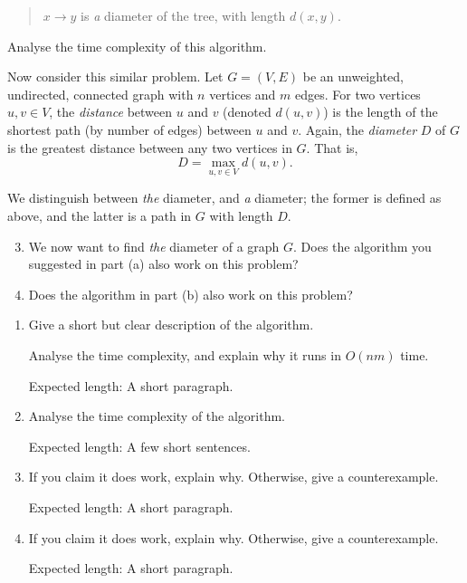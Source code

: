 \documentclass[12pt]{article}
\begin{document}
\begin{question}
\begin{enumerate}[label=(\alph*)]
\begin{quote}
        $x \rightarrow y$ is {\em a} diameter of the tree, with length $d(x,y)$.
    \end{quote} 
    Analyse the time complexity of this algorithm.
\end{enumerate}

Now consider this similar problem. Let $G = (V,E)$ be an unweighted, undirected, connected graph with $n$ vertices and $m$ edges. For two vertices $u,v \in V$, the \textit{distance} between $u$ and $v$ (denoted $d(u,v)$) is the length of the shortest path (by number of edges) between $u$ and $v$. Again, the {\em diameter} $D$ of $G$ is the greatest distance between any two vertices in $G$. That is,
\[ D = \max_{u,v\in V} d(u,v). \]

We distinguish between {\em the} diameter, and {\em a} diameter; the former is defined as above, and the latter is a path in $G$ with length $D$.

\begin{enumerate}[label=(\alph*)]
    \setcounter{enumi}{2}
    \item We now want to find {\em the} diameter of a graph $G$. Does the algorithm you suggested in part (a) also work on this problem?
    \item Does the algorithm in part (b) also work on this problem?
\end{enumerate}

\end{question}

\begin{rubric}
\begin{enumerate}
    \item  Give a short but clear description of the algorithm.
        
    Analyse the time complexity, and explain why it runs in $O(nm)$ time.
    
    Expected length: A short paragraph.
    \item 
    Analyse the time complexity of the algorithm.
    
    Expected length: A few short sentences.
    \item If you claim it does work, explain why. Otherwise, give a counterexample.
    
    Expected length: A short paragraph.
    \item If you claim it does work, explain why. Otherwise, give a counterexample.
    
    Expected length: A short paragraph.
\end{enumerate}
\end{rubric}

\begin{solution}
\end{solution}

\begin{attribution}
\end{attribution}
\end{document}
